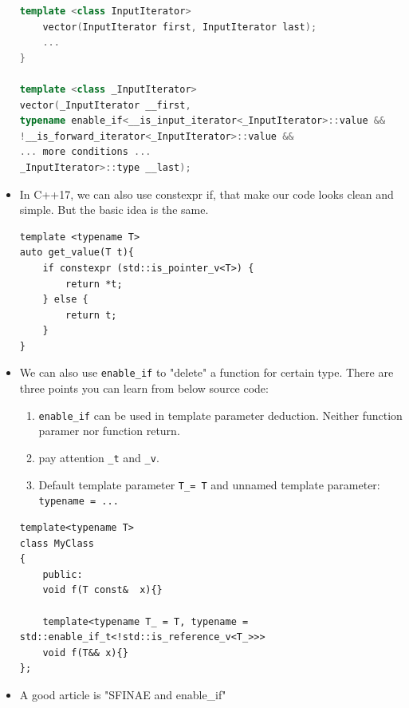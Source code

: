 \documentclass[a4paper,11pt,twoside]{book}
\begin{document}
\begin{itemize}
\begin{lstlisting}[frame=single, language=c++]
	template <class InputIterator>
	vector(InputIterator first, InputIterator last);
	...
}

template <class _InputIterator>
vector(_InputIterator __first,
typename enable_if<__is_input_iterator<_InputIterator>::value &&
!__is_forward_iterator<_InputIterator>::value &&
... more conditions ...
_InputIterator>::type __last);
\end{lstlisting}	

\item In C++17, we can also use constexpr if, that make our code looks clean and simple. But the basic idea is the same. 

\begin{lstlisting}[numbers=none]
template <typename T>
auto get_value(T t){
	if constexpr (std::is_pointer_v<T>) {
		return *t;
	} else {
		return t;
	}
}
\end{lstlisting}

		\item We can also use \texttt{enable\_if} to "delete" a function for certain type. There are three points you can learn from below source code:
		\begin{enumerate}
			\item \texttt{enable\_if} can be used in template parameter deduction. Neither function paramer nor function return.
			\item pay attention \texttt{\_t} and \texttt{\_v}.
			\item Default template parameter \texttt{T\_= T} and unnamed template parameter: \texttt{typename = ...}
		\end{enumerate}
\begin{lstlisting}[numbers=none]
template<typename T>
class MyClass
{
	public:
	void f(T const&  x){}
	
	template<typename T_ = T, typename = std::enable_if_t<!std::is_reference_v<T_>>>
	void f(T&& x){}
};
\end{lstlisting}		
		
	
	\item A good article is "SFINAE and enable\_if"
\end{itemize}
\end{document}
